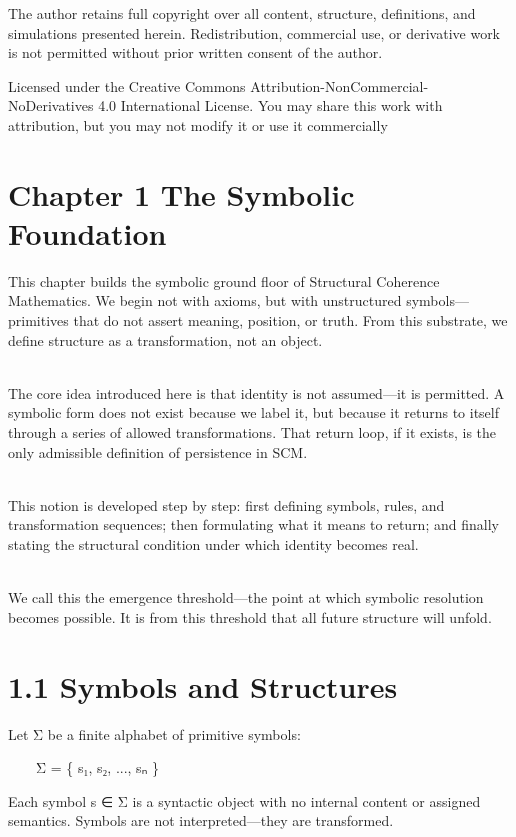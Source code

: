 The author retains full copyright over all content, structure,
definitions, and simulations presented herein. Redistribution,
commercial use, or derivative work is not permitted without prior
written consent of the author.

Licensed under the Creative Commons
Attribution-NonCommercial-NoDerivatives 4.0 International License. You
may share this work with attribution, but you may not modify it or use
it commercially

\section{\texorpdfstring{\hfill\break
Chapter 1 \textbar{} The Symbolic
Foundation}{ Chapter 1 \textbar{} The Symbolic Foundation}}\label{chapter-1-the-symbolic-foundation}

This chapter builds the symbolic ground floor of Structural Coherence
Mathematics. We begin not with axioms, but with unstructured
symbols---primitives that do not assert meaning, position, or truth.
From this substrate, we define structure as a transformation, not an
object.\\
\strut \\
The core idea introduced here is that identity is not assumed---it is
permitted. A symbolic form does not exist because we label it, but
because it returns to itself through a series of allowed
transformations. That return loop, if it exists, is the only admissible
definition of persistence in SCM.\\
\strut \\
This notion is developed step by step: first defining symbols, rules,
and transformation sequences; then formulating what it means to return;
and finally stating the structural condition under which identity
becomes real.\\
\strut \\
We call this the emergence threshold---the point at which symbolic
resolution becomes possible. It is from this threshold that all future
structure will unfold.

\section{1.1 \textbar{} Symbols and
Structures}\label{symbols-and-structures}

Let Σ be a finite alphabet of primitive symbols:

  Σ = \{ s₁, s₂, ..., sₙ \}

Each symbol s ∈ Σ is a syntactic object with no internal content or
assigned semantics. Symbols are not interpreted---they are transformed.

